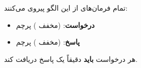 

\CNchained{}

تمام فرمان‌های  از این الگو پیروی می‌کنند:

\begin{itemize}
\tightlist
\item
  \textbf{درخواست}:  (مخفف )  پرچم 
\item
  \textbf{پاسخ}:  (مخفف )  پرچم 
\end{itemize}

هر درخواست \textbf{باید} دقیقاً یک پاسخ دریافت کند.



